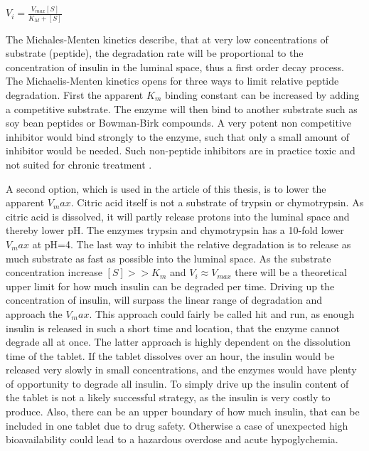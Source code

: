 $V_i = \frac{V_{max} [S]}{K_{M}+[S]}$

The Michales-Menten kinetics describe, that at very low concentrations of substrate (peptide), the degradation rate will be proportional to the concentration of insulin in the luminal space, thus a first order decay process. 
The Michaelis-Menten kinetics opens for three ways to limit relative peptide degradation. First the apparent $K_m$ binding constant can be increased by adding a competitive substrate. The enzyme will then bind to another substrate such as soy bean peptides or Bowman-Birk compounds. A very potent non competitive inhibitor would bind strongly to the enzyme, such that only a small amount of inhibitor would be needed. Such non-peptide inhibitors are in practice toxic and not suited for chronic treatment \cite{bernkop1998use,murthy1980effect}. 

A second option, which is used in the article \cite{welling2014citric} of this thesis, is to lower the apparent $V_max$. Citric acid itself is not a substrate of trypsin or chymotrypsin. As citric acid is dissolved, it will partly release protons into the luminal space and thereby lower pH. The enzymes trypsin and chymotrypsin has a 10-fold lower $V_max$ at pH=4.
The last way to inhibit the relative degradation is to release as much substrate as fast as possible into the luminal space. As the substrate concentration increase $[S] >> K_m$ and $V_i \approx V_{max}$ there will be a theoretical upper limit for how much insulin can be degraded per time. Driving up the concentration of insulin, will surpass the linear range of degradation and approach the $V_max$. This approach could fairly be called hit and run, as enough insulin is released in such a short time and location, that the enzyme cannot degrade all at once. The latter approach is highly dependent on the dissolution time of the tablet. If the tablet dissolves over an hour, the insulin would be released very slowly in small concentrations, and the enzymes would have plenty of opportunity to degrade all insulin. To simply drive up the insulin content of the tablet is not a likely successful strategy, as the insulin is very costly to produce. Also, there can be an upper boundary of how much insulin, that can be included in one tablet due to drug safety. Otherwise a case of unexpected high bioavailability could lead to a hazardous overdose and acute hypoglychemia.

\newpage

